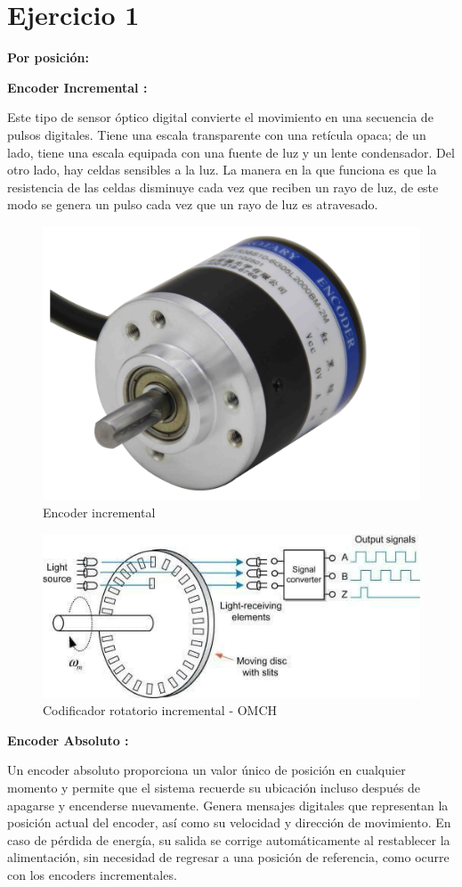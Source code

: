 \section{Ejercicio 1}
\vspace{10mm}
\textbf{Por posición:}
\vspace{5mm}

\textbf{Encoder Incremental :} 

Este tipo de sensor óptico digital convierte el movimiento en una secuencia de pulsos digitales. Tiene una escala transparente con una retícula opaca; de un lado, tiene una escala equipada con una fuente de luz y un lente condensador. Del otro lado, hay celdas sensibles a la luz. La manera en la que funciona es que la resistencia de las celdas disminuye cada vez que reciben un rayo de luz, de este modo se genera un pulso cada vez que un rayo de luz es atravesado.


\begin{figure}[h]
	\centering
	\includegraphics[width=0.4\linewidth]{portada/20150317193931229}
	\caption{Encoder incremental}
	\label{fig:20150317193931229}
\end{figure}

\begin{figure}[h]
	\centering
	\includegraphics[width=0.4\linewidth]{img/Sencoderincremental}
	\caption{Codificador rotatorio incremental - OMCH}
	\label{fig:Sencoderincremental}
\end{figure}
\vspace{10mm}
\textbf{Encoder Absoluto :} 

Un encoder absoluto proporciona un valor único de posición en cualquier momento y permite que el sistema recuerde su ubicación incluso después de apagarse y encenderse nuevamente. Genera mensajes digitales que representan la posición actual del encoder, así como su velocidad y dirección de movimiento. En caso de pérdida de energía, su salida se corrige automáticamente al restablecer la alimentación, sin necesidad de regresar a una posición de referencia, como ocurre con los encoders incrementales.\\\\\\\\\\\\

